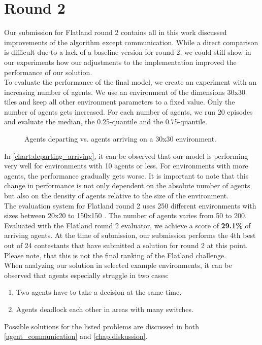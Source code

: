 \section{Round 2}
Our submission for Flatland round 2 contains all in this work discussed improvements of the algorithm except communication. While a direct comparison is difficult due to a lack of a baseline version for round 2, we could still show in our experiments how our adjustments to the implementation improved the performance of our solution.\\
To evaluate the performance of the final model, we create an experiment with an increasing number of agents. We use an environment of the dimensions 30x30 tiles and keep all other environment parameters to a fixed value. Only the number of agents gets increased. For each number of agents, we run 20 episodes and evaluate the median, the 0.25-quantile and the 0.75-quantile.
\begin{figure}[H]
	\begin{center}
		
	\end{center}
	\caption{Agents departing vs. agents arriving on a 30x30 environment.}
	\label{chart:departing_arriving}
\end{figure}
In \autoref{chart:departing_arriving}, it can be observed that our model is performing very well for environments with 10 agents or less. For environments with more agents, the performance gradually gets worse. It is important to note that this change in performance is not only dependent on the absolute number of agents but also on the density of agents relative to the size of the environment.\\
The evaluation system for Flatland round 2 uses 250 different environments with sizes between 20x20 to 150x150 \cite{flatland_faq}. The number of agents varies from 50 to 200.
Evaluated with the Flatland round 2 evaluator, we achieve a score of \textbf{29.1\%} of arriving agents. At the time of submission, our submission performs the 4th best out of 24 contestants that have submitted a solution for round 2 at this point. Please note, that this is not the final ranking of the Flatland challenge.\\
When analyzing our solution in selected example environments, it can be observed that agents especially struggle in two cases:
\begin{enumerate}
	\item Two agents have to take a decision at the same time.
	\item Agents deadlock each other in areas with many switches.
\end{enumerate}
Possible solutions for the listed problems are discussed in both \autoref{agent_communication} and \autoref{chap.diskussion}.







